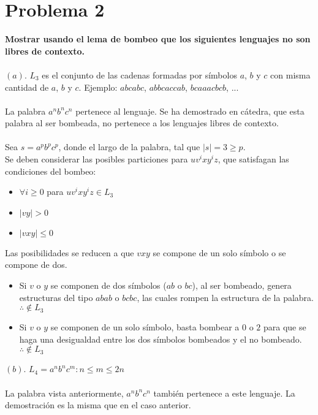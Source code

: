 \documentclass[spanish]{article}
\begin{document}
\section{Problema 2}
\textbf{Mostrar usando el lema de bombeo que los siguientes lenguajes no son libres de contexto.}
\\\\
$(a)$. $L_3$ es el conjunto de las cadenas formadas por símbolos $a$, $b$ y $c$ con misma cantidad de $a$, $b$ y $c$. Ejemplo: $abcabc$, $abbcaccab$, $bcaaacbcb$, ...
\\\\
La palabra $a^nb^nc^n$ pertenece al lenguaje. Se ha demostrado en cátedra, que esta palabra al ser bombeada, no pertenece a los lenguajes libres de contexto.
\\\\
Sea $s=a^pb^pc^p$, donde el largo de la palabra, tal que $|s|=3\geq p$. \\
Se deben considerar las posibles particiones para $uv^ixy^iz$, que satisfagan las condiciones del bombeo:
\begin{itemize}
\item $\forall i \geq 0$ para $uv^ixy^iz \in L_3$ 
\item $|vy|>0$
\item $|vxy|\leq 0$
\end{itemize}
Las posibilidades se reducen a que $vxy$ se compone de un solo símbolo o se compone de dos.
\begin{itemize}
\item Si $v$ o $y$ se componen de dos símbolos ($ab$ o $bc$), al ser bombeado, genera estructuras del tipo $abab$ o $bcbc$, las cuales rompen la estructura de la palabra. $\therefore \notin L_3$
\item Si $v$ o $y$ se componen de un solo símbolo, basta bombear a $0$ o $2$ para que se haga una desigualdad entre los dos símbolos bombeados y el no bombeado. $\therefore \notin L_3$
\end{itemize}
$(b)$. $L_4 = {a^nb^nc^m : n \leq m \leq 2n}$
\\\\
La palabra vista anteriormente, $a^nb^nc^n$ también pertenece a este lenguaje. La demostración es la misma que en el caso anterior.
\newpage
\end{document}
